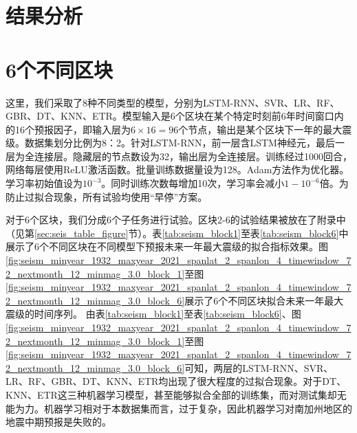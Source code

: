 \section{结果分析}\label{sec:seism_result}

\section{6个不同区块}\label{sec:seism_result_6}

这里，我们采取了8种不同类型的模型，分别为LSTM-RNN、SVR、LR、RF、GBR、DT、KNN、ETR。模型输入是6个区块在某个特定时刻前6年时间窗口内的16个预报因子，即输入层为$6\times 16=96$个节点，输出是某个区块下一年的最大震级。数据集划分比例为8：2。针对LSTM-RNN，前一层含LSTM神经元，最后一层为全连接层。隐藏层的节点数设为32，输出层为全连接层。训练经过1000回合，网络每层使用ReLU激活函数。批量训练数据量设为128。Adam方法作为优化器。学习率初始值设为$10^{-3}$。同时训练次数每增加10次，学习率会减小$1-10^{-6}$倍。为防止过拟合现象，所有试验均使用“早停”方案。

对于6个区块，我们分成6个子任务进行试验。区块2-6的试验结果被放在了附录中（见第\ref{sec:seis_table_figure}节）。表\ref{tab:seism_block1}至表\ref{tab:seism_block6}中展示了6个不同区块在不同模型下预报未来一年最大震级的拟合指标效果。图\ref{fig:seism_minyear_1932_maxyear_2021_spanlat_2_spanlon_4_timewindow_72_nextmonth_12_minmag_3.0_block_1}至图\ref{fig:seism_minyear_1932_maxyear_2021_spanlat_2_spanlon_4_timewindow_72_nextmonth_12_minmag_3.0_block_6}展示了6个不同区块拟合未来一年最大震级的时间序列。
由表\ref{tab:seism_block1}至表\ref{tab:seism_block6}、图\ref{fig:seism_minyear_1932_maxyear_2021_spanlat_2_spanlon_4_timewindow_72_nextmonth_12_minmag_3.0_block_1}至图\ref{fig:seism_minyear_1932_maxyear_2021_spanlat_2_spanlon_4_timewindow_72_nextmonth_12_minmag_3.0_block_6}可知，两层的LSTM-RNN、SVR、LR、RF、GBR、DT、KNN、ETR均出现了很大程度的过拟合现象。对于DT、KNN、ETR这三种机器学习模型，甚至能够拟合全部的训练集，而对测试集却无能为力。机器学习相对于本数据集而言，过于复杂，因此机器学习对南加州地区的地震中期预报是失败的。

